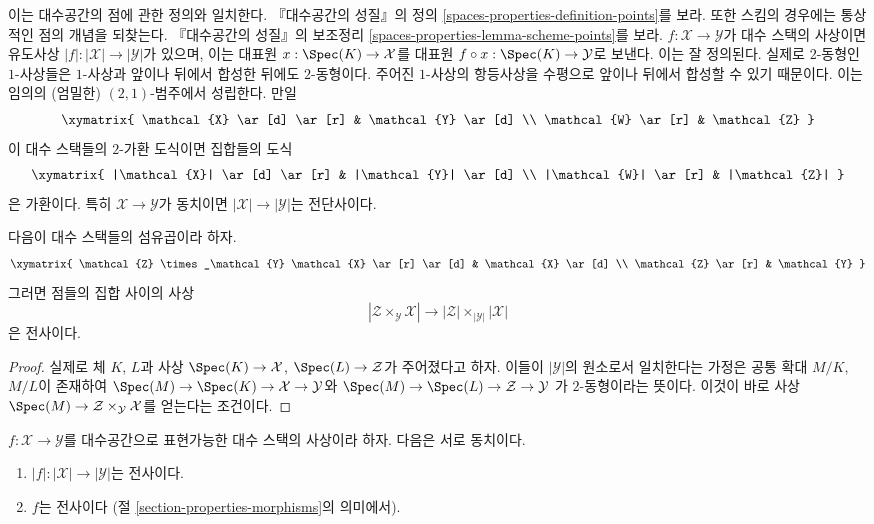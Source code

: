 \noindent
이는 대수공간의 점에 관한 정의와 일치한다. 『대수공간의 성질』의 정의
\ref{spaces-properties-definition-points}를 보라.
또한 스킴의 경우에는 통상적인 점의 개념을 되찾는다. 『대수공간의 성질』의
보조정리 \ref{spaces-properties-lemma-scheme-points}를 보라.
$f : \mathcal{X} \to \mathcal{Y}$가 대수 스택의 사상이면 유도사상
$|f| : |\mathcal{X}| \to |\mathcal{Y}|$가 있으며, 이는 대표원
$x : \Spec(K) \to \mathcal{X}$를 대표원
$f \circ x : \Spec(K) \to \mathcal{Y}$로 보낸다. 이는 잘 정의된다.
실제로 $2$-동형인 $1$-사상들은 $1$-사상과 앞이나 뒤에서 합성한 뒤에도
$2$-동형이다. 주어진 $1$-사상의 항등사상을 수평으로 앞이나 뒤에서
합성할 수 있기 때문이다. 이는 임의의 (엄밀한) $(2, 1)$-범주에서 성립한다.
만일
$$
\xymatrix{
\mathcal{X} \ar[d] \ar[r] & \mathcal{Y} \ar[d] \\
\mathcal{W} \ar[r] & \mathcal{Z}
}
$$
이 대수 스택들의 $2$-가환 도식이면 집합들의 도식
$$
\xymatrix{
|\mathcal{X}| \ar[d] \ar[r] & |\mathcal{Y}| \ar[d] \\
|\mathcal{W}| \ar[r] & |\mathcal{Z}|
}
$$
은 가환이다. 특히 $\mathcal{X} \to \mathcal{Y}$가 동치이면
$|\mathcal{X}| \to |\mathcal{Y}|$는 전단사이다.

\begin{lemma}
\label{lemma-points-cartesian}
다음이 대수 스택들의 섬유곱이라 하자.
$$
\xymatrix{
\mathcal{Z} \times_\mathcal{Y} \mathcal{X} \ar[r] \ar[d] &
\mathcal{X} \ar[d] \\
\mathcal{Z} \ar[r] & \mathcal{Y}
}
$$
그러면 점들의 집합 사이의 사상
$$
|\mathcal{Z} \times_\mathcal{Y} \mathcal{X}|
\longrightarrow
|\mathcal{Z}| \times_{|\mathcal{Y}|} |\mathcal{X}|
$$
은 전사이다.
\end{lemma}

\begin{proof}
실제로 체 $K$, $L$과 사상
$\Spec(K) \to \mathcal{X}$, $\Spec(L) \to \mathcal{Z}$가
주어졌다고 하자. 이들이 $|\mathcal{Y}|$의 원소로서 일치한다는 가정은
공통 확대 $M/K$, $M/L$이 존재하여
$\Spec(M) \to \Spec(K) \to \mathcal{X} \to \mathcal{Y}$와
$\Spec(M) \to \Spec(L) \to \mathcal{Z} \to \mathcal{Y}$
가 $2$-동형이라는 뜻이다. 이것이 바로 사상
$\Spec(M) \to \mathcal{Z} \times_\mathcal{Y} \mathcal{X}$를
얻는다는 조건이다.
\end{proof}

\begin{lemma}
\label{lemma-characterize-surjective}
$f : \mathcal{X} \to \mathcal{Y}$를 대수공간으로 표현가능한
대수 스택의 사상이라 하자. 다음은 서로 동치이다.
\begin{enumerate}
\item $|f| : |\mathcal{X}| \to |\mathcal{Y}|$는 전사이다.
\item $f$는 전사이다
(절 \ref{section-properties-morphisms}의 의미에서).
\end{enumerate}
\end{lemma}

